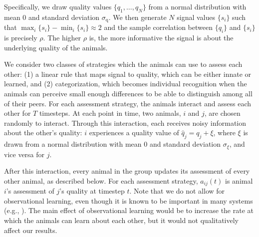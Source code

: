 Specifically, we draw quality values $\{q_1,\dots,q_N\}$ from a normal distribution with mean $0$ and standard deviation $\sigma_\text{q}$. We then generate $N$ signal values $\{s_i\}$ such that 
$\max_i\{s_i\}-\min_i\{s_i\}\approx 2$ and the sample correlation between $\{q_i\}$ and $\{s_i\}$ is precisely $\rho$. 
The higher $\rho$ is, the more informative the signal is about the underlying quality of the animals. 

We consider two classes of strategies which the animals can use to assess each other: (1) a linear rule that maps signal to quality, which can be either innate or learned, and (2) categorization, which becomes individual recognition when the animals can perceive small enough differences to be able to distinguish among all of their peers. For each assessment strategy, the animals interact and assess each other for $T$ timesteps. At each point in time, two animals, $i$ and $j$, are chosen randomly to interact. Through this interaction, each receives noisy information about the other's quality: $i$ experiences a quality value of $\hat{q}_j=q_j+\xi$, where $\xi$ is drawn from a normal distribution with mean $0$ and standard deviation $\sigma_\xi$, and vice versa for $j$. 

After this interaction, every animal in the group updates its assessment of every other animal, as described below. For each assessment strategy, $a_{ij}(t)$ is animal $i$'s assessment of $j$'s quality at timestep $t$. Note that we do not allow for observational learning, even though it is known to be important in many systems (e.g., \citep{Freeman:1985kl,Holekamp:1991nx,Schaik:2011oq,Hobson:2015uq,Seyfarth2015SocialCognition}). The main effect of observational learning would be to increase the rate at which the animals can learn about each other, but it would not qualitatively affect our results. 


